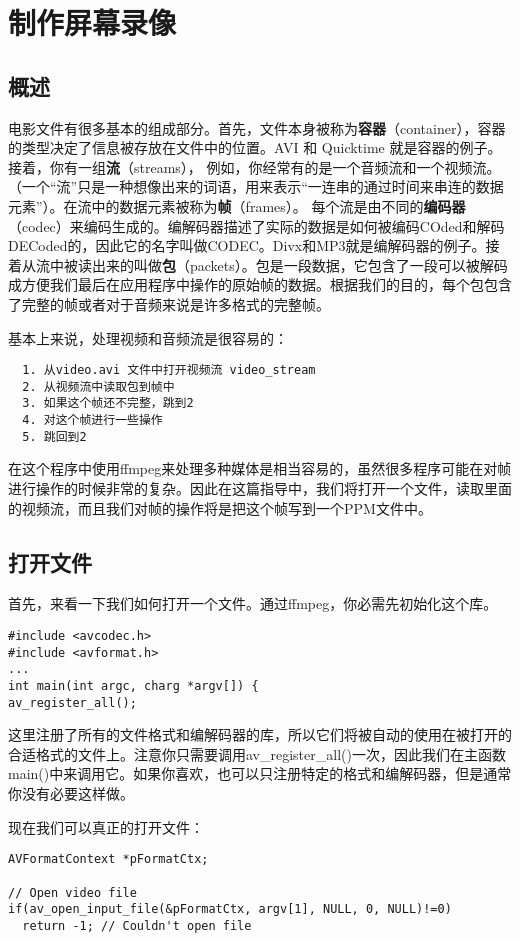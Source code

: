 ﻿\chapter{制作屏幕录像}
\label{ch1}
\section{概述}
电影文件有很多基本的组成部分。首先，文件本身被称为\textbf{容器}（container），容器的类型决定了信息被存放在文件中的位置。AVI 和 Quicktime 就是容器的例子。接着，你有一组\textbf{流}（streams）， 例如，你经常有的是一个音频流和一个视频流。（一个“流”只是一种想像出来的词语，用来表示“一连串的通过时间来串连的数据元素”）。在流中的数据元素被称为\textbf{帧}（frames）。 每个流是由不同的\textbf{编码器}（codec）来编码生成的。编解码器描述了实际的数据是如何被编码COded和解码DECoded的，因此它的名字叫做CODEC。Divx和MP3就是编解码器的例子。接着从流中被读出来的叫做\textbf{包}（packets）。包是一段数据，它包含了一段可以被解码成方便我们最后在应用程序中操作的原始帧的数据。根据我们的目的，每个包包含了完整的帧或者对于音频来说是许多格式的完整帧。

基本上来说，处理视频和音频流是很容易的：

\begin{verbatim}
  1. 从video.avi 文件中打开视频流 video_stream
  2. 从视频流中读取包到帧中
  3. 如果这个帧还不完整，跳到2
  4. 对这个帧进行一些操作
  5. 跳回到2
\end{verbatim}


在这个程序中使用ffmpeg来处理多种媒体是相当容易的，虽然很多程序可能在对帧进行操作的时候非常的复杂。因此在这篇指导中，我们将打开一个文件，读取里面的视频流，而且我们对帧的操作将是把这个帧写到一个PPM文件中。

\section{打开文件}

首先，来看一下我们如何打开一个文件。通过ffmpeg，你必需先初始化这个库。
\begin{lstlisting}
#include <avcodec.h>
#include <avformat.h>
...
int main(int argc, charg *argv[]) {
av_register_all();
\end{lstlisting}


这里注册了所有的文件格式和编解码器的库，所以它们将被自动的使用在被打开的合适格式的文件上。注意你只需要调用av_register_all()一次，因此我们在主函数main()中来调用它。如果你喜欢，也可以只注册特定的格式和编解码器，但是通常你没有必要这样做。

现在我们可以真正的打开文件：
\begin{lstlisting}
AVFormatContext *pFormatCtx;

// Open video file
if(av_open_input_file(&pFormatCtx, argv[1], NULL, 0, NULL)!=0)
  return -1; // Couldn't open file
\end{lstlisting}

